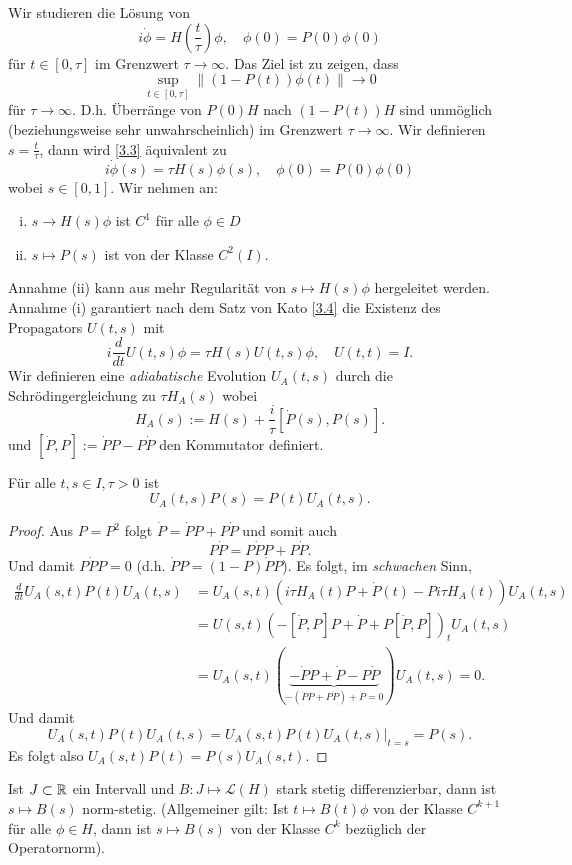 \documentclass{mycourse}
\begin{document}
Wir studieren die Lösung von
\begin{equation}\label{3.3}
i \dot \phi = H(\frac{t}{\tau}) \phi,\quad \phi(0)= P(0) \phi(0)
\end{equation}
für $t\in [0, \tau]$ im Grenzwert $\tau \to \infty$. Das Ziel ist zu zeigen, dass
\[
\sup_{t\in [0, \tau]} \| (1- P(t)) \phi(t) \| \to 0
\]
für $\tau \to \infty$. D.h. Überränge von $P(0) H$ nach $(1- P(t))H$ sind unmöglich (beziehungsweise sehr unwahrscheinlich) im Grenzwert $\tau \to \infty$. Wir definieren $s=\frac{t}{\tau}$, dann wird \eqref{3.3} äquivalent zu
\[
i \dot \phi(s) = \tau H(s) \phi(s), \quad \phi(0)= P(0) \phi(0)
\]
wobei $s\in [0,1]$. Wir nehmen an:
\begin{enumerate}[(i)]
\item $s\to H(s) \phi$ ist $C^1$ für alle $\phi\in D$
\item $s\mapsto P(s)$ ist von der Klasse $C^2(I)$.
\end{enumerate}
Annahme (ii) kann aus mehr Regularität von $s\mapsto H(s) \phi$ hergeleitet werden. Annahme (i) garantiert nach dem Satz von Kato \ref{3.4} die Existenz des Propagators $U(t,s)$ mit
\[
i \frac{d}{dt} U(t,s) \phi= \tau H(s) U(t,s) \phi, \quad U(t,t) = I.
\]
Wir definieren eine \emph{adiabatische} Evolution $U_A(t,s)$ durch die Schrödingergleichung zu $\tau H_A(s)$ wobei
\[
H_A(s):= H(s) + \frac{i}{\tau} [\dot P(s), P(s)].
\]
und $[\dot P, P]:= \dot P P - P \dot P$ den Kommutator definiert.
\begin{lem} Für alle $t,s \in I, \tau >0$ ist
\[
U_A(t,s) P(s) = P(t) U_A(t,s).
\]
\end{lem}
\begin{proof}
Aus $P=P^2$ folgt $\dot P=\dot P P + P \dot P$ und somit auch
\[
P\dot P = P \dot P P + P \dot P.
\]
Und damit $P\dot P P =0$ (d.h. $\dot P P = (1-P) \dot PP$). Es folgt, im \emph{schwachen} Sinn,
\begin{align*}
\frac{d}{dt} U_A(s,t) P(t) U_A(t,s)&= U_A(s,t) (i \tau H_A(t) P+ \dot P(t)-P i\tau H_A(t))U_A(t,s)\\
&=U(s,t)(-[\dot P, P] P+ \dot P + P [\dot P, P])_t U_A(t,s)\\
&= U_A(s,t) (\underbrace{-\dot P P + \dot P - P \dot P}_{-(\dot P P + P \dot P) + \dot P=0}) U_A(t,s)=0.
\end{align*}
Und damit
\[
U_A(s,t) P(t) U_A(t,s) = U_A(s,t) P(t) U_A(t,s)\big|_{t=s} = P(s).
\]
Es folgt also $U_A(s,t)P(t)=P(s) U_A(s,t)$.
\end{proof}

\begin{lem}\label{4.6}
Ist $J\subset \mathbb{R}$ ein Intervall und $B: J \mapsto \mathcal L(H)$ stark stetig differenzierbar, dann ist $s\mapsto B(s)$ norm-stetig. (Allgemeiner gilt: Ist $t\mapsto B(t) \phi$ von der Klasse $C^{k+1}$ für alle $\phi \in H$, dann ist $s\mapsto B(s)$ von der Klasse $C^k$ bezüglich der Operatornorm).
\end{lem}
\end{document}
